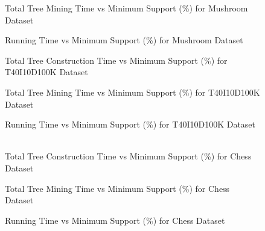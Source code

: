 			\begin{figure}[h]
			\centering
				
			\caption{Total Tree Mining Time vs Minimum Support (\%) for Mushroom Dataset ~\cite{dataset}}
			\label{result:g_m_mining_total}
			\end{figure}
			\begin{figure}[h]
			\centering
				
			\caption{Running Time vs Minimum Support (\%) for Mushroom Dataset ~\cite{dataset}}
			\label{result:g_m_total}
			\end{figure}
			\begin{figure}[h]
			\centering
				
			\caption{Total Tree Construction Time vs Minimum Support (\%) for T40I10D100K Dataset ~\cite{dataset}}
			\label{result:g_t10_tree_construction_total}
			\end{figure}
			
			\begin{figure}[h]
			\centering
				
			\caption{Total Tree Mining Time vs Minimum Support (\%) for T40I10D100K Dataset ~\cite{dataset}}
			\label{result:g_t10_mining_total}
			\end{figure}
			
			\begin{figure}[h]
			\centering
				
			\caption{Running Time vs Minimum Support (\%) for T40I10D100K Dataset ~\cite{dataset}}
			\label{result:g_t10_total}
			\end{figure}
	
			\begin{figure}[h]
			\centering
				
			\caption{Total Tree Construction Time vs Minimum Support (\%) for Chess Dataset ~\cite{dataset}}
			\label{result:g_chess_tree_construction_total}
			\end{figure}
			
			\begin{figure}[h]
			\centering
				
			\caption{Total Tree Mining Time vs Minimum Support (\%) for Chess Dataset ~\cite{dataset}}
			\label{result:g_chess_mining_total}
			\end{figure}
			
			\begin{figure}[h]
			\centering
				
			\caption{Running Time vs Minimum Support (\%) for Chess Dataset ~\cite{dataset}}
			\label{result:g_chess_total}
			\end{figure}
\clearpage
